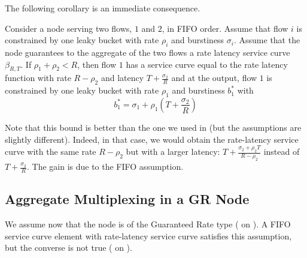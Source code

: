 The following corollary is an immediate consequence.
\begin{corollary}
Consider a node serving two flows, $1$ and $2$, in FIFO order.
Assume that flow $i$ is constrained by one leaky bucket with rate
$\rho_i$ and burstiness $\sigma_i$. Assume that the node
guarantees to the aggregate of the two flows a rate latency
service curve $\beta_{R,T}$. If $\rho_1 + \rho_2 < R$,  then flow
$1$ has a service curve equal to the rate latency function with
rate $R-\rho_2$ and latency $T+\frac{\sigma_2}{R}$ and at the
output, flow $1$ is constrained by one leaky bucket with rate
$\rho_1$ and burstiness $b^*_1$ with
$$
b^*_1= \sigma_1 +\rho_1 \left(T+\frac{\sigma_2}{R}\right)
$$
\end{corollary}


Note that this bound is better than the one we used in
 (but the assumptions are slightly different).
Indeed, in that case, we would obtain the rate-latency service
curve with the same rate $R-\rho_2$ but with a larger latency:
$T+\frac{\sigma_2+\rho_2 T}{R-\rho_2}$ instead of
$T+\frac{\sigma_2}{R}$. The gain is due to the FIFO assumption.



\subsection{Aggregate Multiplexing in a GR Node}
We assume now that the node is of the Guaranteed Rate type
( on ). A FIFO service curve element
with rate-latency service curve satisfies this assumption, but the
converse is not true ( on ).

